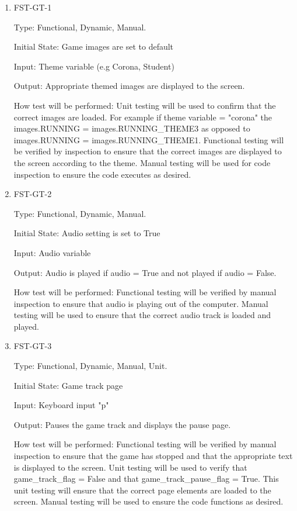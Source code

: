 \documentclass[12pt, titlepage]{article}
\begin{document}
\begin{enumerate}

\item{FST-GT-1\\}

Type: Functional, Dynamic, Manual.
					
Initial State: Game images are set to default 
					
Input: Theme variable (e.g Corona, Student)
					
Output: Appropriate themed images are displayed to the screen.
					
How test will be performed: Unit testing will be used to confirm that the correct images are loaded. For example if theme variable = "corona" the images.RUNNING = images.RUNNING\_THEME3 as opposed to images.RUNNING = images.RUNNING\_THEME1. Functional testing will be verified by inspection to ensure that the correct images are displayed to the screen according to the theme. Manual testing will be used for code inspection to ensure the code executes as desired. 
					
\item{FST-GT-2\\}

Type: Functional, Dynamic, Manual.
					
Initial State: Audio setting is set to True 
					
Input: Audio variable 
					
Output: Audio is played if audio = True and not played if audio = False. 
					
How test will be performed: Functional testing will be verified by manual inspection to ensure that audio is playing out of the computer. Manual testing will be used to ensure that the correct audio track is loaded and played. 

\item{FST-GT-3\\}

Type: Functional, Dynamic, Manual, Unit.
					
Initial State: Game track page 
					
Input: Keyboard input "p" 
					
Output: Pauses the game track and displays the pause page. 
					
How test will be performed: Functional testing will be verified by manual inspection to ensure that the game has stopped and that the appropriate text is displayed to the screen. Unit testing will be used to verify that game\_track\_flag = False and that game\_track\_pause\_flag = True. This unit testing will ensure that the correct page elements are loaded to the screen. Manual testing will be used to ensure the code functions as desired. 


\end{enumerate}
\end{document}
